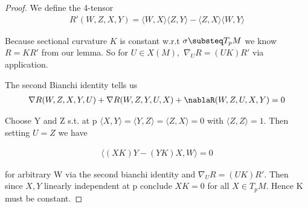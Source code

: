 \documentclass[11pt]{article}
\begin{document}
\begin{proof}
	We define the 4-tensor 
	\begin{align*}
		R'(W,Z,X,Y) = \langle W,X\rangle \langle Z,Y\rangle - \langle Z,X\rangle \langle W,Y \rangle 
	\end{align*}

	Because sectional curvature $K$ is constant w.r.t $\sigma \substeq T_pM$ we know $R = KR'$ from our lemma. So for $U \in X(M),$ $\nabla_U R = (UK)R'$ via application.

	The second Bianchi identity tells us 
	\begin{align*}
		\nabla R(W,Z,X,Y,U) + \nabla R(W,Z,Y,U,X) + \nablaR (W,Z,U,X,Y) = 0
	\end{align*}




	Choose Y and Z s.t. at p $\langle X,Y\rangle = \langle Y,Z\rangle = \langle Z,X\rangle = 0$ with $\langle Z,Z\rangle = 1$. Then setting $U = Z$ we have

	\begin{align*}
		\langle (XK)Y - (YK)X,W\rangle=0
	\end{align*}

	for arbitrary W via the second bianchi identity and $\nabla_U R = (UK)R'$. Then since $X,Y$ linearly independent at p conclude $XK = 0$ for all $X \in T_p M$.  Hence K must be constant.

\end{proof}
\end{document}
